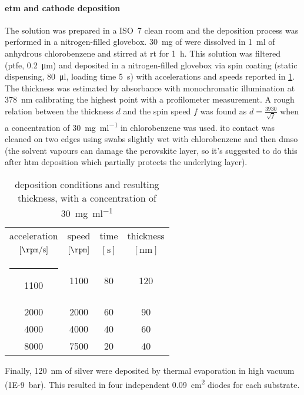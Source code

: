 \paragraph{\Gls{etm} and cathode deposition}
The solution was prepared in a ISO~7 clean room and the deposition process was performed in a nitrogen-filled glovebox. %
\SI{30}{\mg} of  were dissolved in \SI{1}{\ml} of anhydrous chlorobenzene and stirred at \gls{rt} for \SI{1}{\hour}. This solution was filtered (\gls{ptfe}, \SI{0.2}{\um}) and deposited in a nitrogen-filled glovebox via spin coating (static dispensing, \SI{80}{\ul}, loading time \SI{5}{\s}) with accelerations and speeds reported in \cref{pcbm_thickness}. The thickness was estimated by absorbance with monochromatic illumination at \SI{378}{\nm} calibrating the highest point with a profilometer measurement. A rough relation between the thickness $d$ and the spin speed $f$ was found as $d = \frac{3930}{\sqrt{f}}$ when a concentration of \SI{30}{\mg\per\ml} in chlorobenzene was used.
\Gls{ito} contact was cleaned on two edges using swabs slightly wet with chlorobenzene and then \gls{dmso} (the solvent vapours can damage the perovskite layer, so it's suggested to do this after \gls{htm} deposition which partially protects the underlying layer).
\begin{table}%
	\caption{ deposition conditions and resulting thickness, with a concentration of \SI{30}{\mg\per\ml}}\label{pcbm_thickness}
	\begin{center}
		\begin{tabular}{c c c | c}
			acceleration    & speed     & time    & thickness \\
			$[\si{\rpm\per\s}]$ & $[\si{\rpm}]$ & $[\si{\s}]$ & $[\si{\nm}]$  \\
			\hline
			\rule[0ex]{-4pt}{3ex}
			1100            & 1100      & 80      & 120       \\
			2000            & 2000      & 60      & 90        \\
			4000            & 4000      & 40      & 60        \\
			8000            & 7500      & 20      & 40        \\
		\end{tabular}
	\end{center}
\end{table}
Finally, \SI{120}{\nm} of silver were deposited by thermal evaporation in high vacuum (\SI{1E-9}{\bar}). This resulted in four independent \SI{0.09}{\cm\squared} diodes for each substrate.
\label{methods_top_end}

